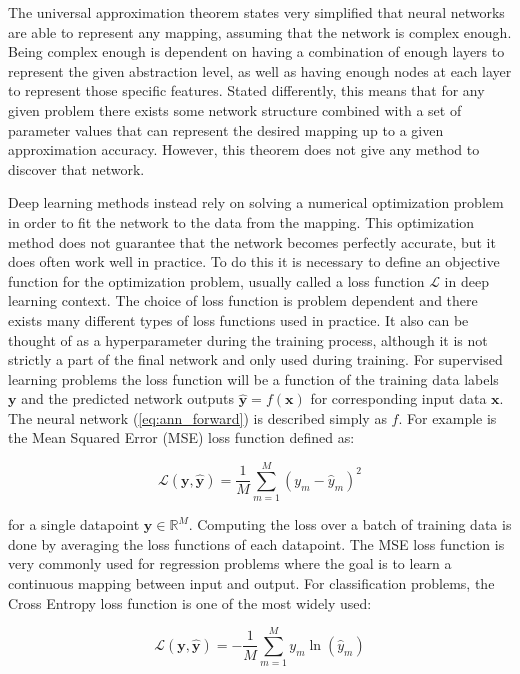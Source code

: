 The universal approximation theorem \cite{Hornik1989MultilayerFN} states very simplified that neural networks are able to represent any mapping, assuming that the network is complex enough. Being complex enough is dependent on having a combination of enough layers to represent the given abstraction level, as well as having enough nodes at each layer to represent those specific features. Stated differently, this means that for any given problem there exists some network structure combined with a set of parameter values that can represent the desired mapping up to a given approximation accuracy. However, this theorem does not give any method to discover that network.

Deep learning methods instead rely on solving a numerical optimization problem in order to fit the network to the data from the mapping. This optimization method does not guarantee that the network becomes perfectly accurate, but it does often work well in practice. To do this it is necessary to define an objective function for the optimization problem, usually called a loss function $\mathcal{L}$ in deep learning context. The choice of loss function is problem dependent and there exists many different types of loss functions used in practice. It also can be thought of as a hyperparameter during the training process, although it is not strictly a part of the final network and only used during training. For supervised learning problems the loss function will be a function of the training data labels $\bm{y}$ and the predicted network outputs $\bm{\hat{y}} = f(\bm{x})$ for corresponding input data $\bm{x}$. The neural network (\ref{eq:ann_forward}) is described simply as $f$. For example is the Mean Squared Error (MSE) loss function defined as: 

\begin{equation}
    \mathcal{L}(\bm{y}, \bm{\hat{y}}) = \frac{1}{M} \sum_{m=1}^{M} (y_m - \hat{y}_m)^2
\end{equation}

\noindent for a single datapoint $\bm{y} \in \mathbb{R}^M$. Computing the loss over a batch of training data is done by averaging the loss functions of each datapoint. The MSE loss function is very commonly used for regression problems where the goal is to learn a continuous mapping between input and output. For classification problems, the Cross Entropy loss function is one of the most widely used:

\begin{equation}
    \mathcal{L}(\bm{y}, \bm{\hat{y}}) = - \frac{1}{M} \sum_{m=1}^{M} y_m \ln{(\hat{y}_m)}
\end{equation}

